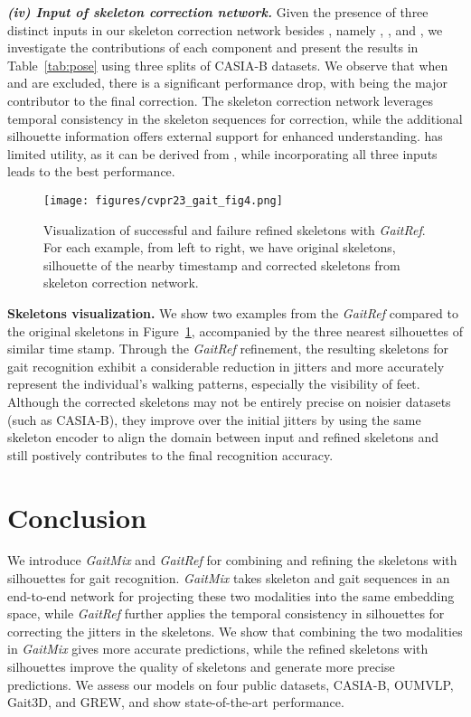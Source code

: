 \documentclass[10pt,twocolumn,letterpaper]{article}
\begin{document}
    \textbf{\textit{(iv) Input of skeleton correction network.}} Given the presence of three distinct inputs in our skeleton correction network besides , namely , , and , we investigate the contributions of each component and present the results in Table~\ref{tab:pose} using three splits of CASIA-B datasets. We observe that when  and  are excluded, there is a significant performance drop, with  being the major contributor to the final correction. The skeleton correction network leverages temporal consistency in the skeleton sequences for correction, while the additional silhouette information offers external support for enhanced understanding.  has limited utility, as it can be derived from , while incorporating all three inputs leads to the best performance.

    



\begin{figure}[t]
    \centering
    \texttt{[image: figures/cvpr23\_gait\_fig4.png]}
    \caption{Visualization of successful and failure refined skeletons with \textit{GaitRef}. For each example, from left to right, we have original skeletons, silhouette of the nearby timestamp and corrected skeletons from skeleton correction network.}
    \label{fig:vis}
\end{figure}


\textbf{Skeletons visualization. } We show two examples from the \textit{GaitRef} compared to the original skeletons in Figure~\ref{fig:vis}, accompanied by the three nearest silhouettes of similar time stamp. Through the \textit{GaitRef} refinement, the resulting skeletons for gait recognition exhibit a considerable reduction in jitters and more accurately represent the individual's walking patterns, especially the visibility of feet. Although the corrected skeletons may not be entirely precise on noisier datasets (such as CASIA-B), they improve over the initial jitters by using the same skeleton encoder to align the domain between input and refined skeletons and still postively contributes to the final recognition accuracy.  \section{Conclusion}
We introduce \textit{GaitMix} and \textit{GaitRef} for combining and refining the skeletons with silhouettes for gait recognition. \textit{GaitMix} takes skeleton and gait sequences in an end-to-end network for projecting these two modalities into the same embedding space, while \textit{GaitRef} further applies the temporal consistency in silhouettes for correcting the jitters in the skeletons. We show that combining the two modalities in \textit{GaitMix} gives more accurate predictions, while the refined skeletons with silhouettes improve the quality of skeletons and generate more precise predictions. We assess our models on four public datasets, CASIA-B, OUMVLP, Gait3D, and GREW, and show state-of-the-art performance.  
\end{document}
